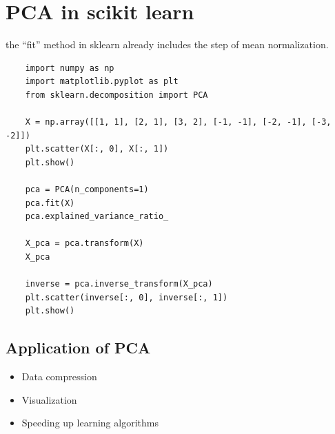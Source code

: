 \section{PCA in scikit learn}
\begin{notebox}
    the ``fit'' method in sklearn already includes the step of mean normalization.
\end{notebox}
\begin{verbatim}
    import numpy as np
    import matplotlib.pyplot as plt
    from sklearn.decomposition import PCA

    X = np.array([[1, 1], [2, 1], [3, 2], [-1, -1], [-2, -1], [-3, -2]])
    plt.scatter(X[:, 0], X[:, 1])
    plt.show()

    pca = PCA(n_components=1)
    pca.fit(X)
    pca.explained_variance_ratio_

    X_pca = pca.transform(X)
    X_pca

    inverse = pca.inverse_transform(X_pca)
    plt.scatter(inverse[:, 0], inverse[:, 1])
    plt.show()
\end{verbatim}

\subsection*{Application of PCA}
\begin{itemize}
    \item Data compression
    \item Visualization
    \item Speeding up learning algorithms
\end{itemize}




